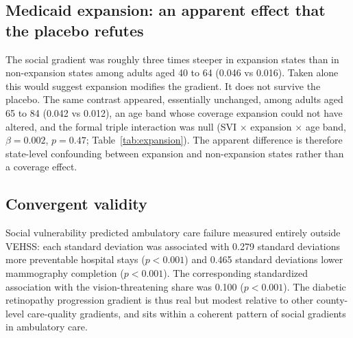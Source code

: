 \documentclass[11pt]{article}
\begin{document}
\subsection{Medicaid expansion: an apparent effect that the placebo refutes}

The social gradient was roughly three times steeper in expansion states than in
non-expansion states among adults aged 40 to 64 (0.046 vs 0.016). Taken alone
this would suggest expansion modifies the gradient. It does not survive the
placebo. The same contrast appeared, essentially unchanged, among adults aged 65
to 84 (0.042 vs 0.012), an age band whose coverage expansion could not have
altered, and the formal triple interaction was null
(SVI $\times$ expansion $\times$ age band, $\beta = 0.002$, $p = 0.47$;
Table~\ref{tab:expansion}). The apparent difference is therefore state-level
confounding between expansion and non-expansion states rather than a coverage
effect.

\subsection{Convergent validity}

Social vulnerability predicted ambulatory care failure measured entirely outside
VEHSS: each standard deviation was associated with 0.279 standard deviations
more preventable hospital stays ($p<0.001$) and 0.465 standard deviations lower
mammography completion ($p<0.001$). The corresponding standardized association
with the vision-threatening share was 0.100 ($p<0.001$). The diabetic
retinopathy progression gradient is thus real but modest relative to other
county-level care-quality gradients, and sits within a coherent pattern of
social gradients in ambulatory care.
\end{document}
